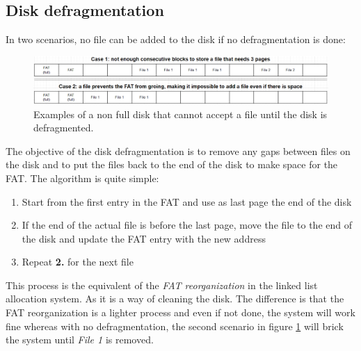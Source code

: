\documentclass[10pt,a4paper]{ULBreport}
\begin{document}
\subsection{Disk defragmentation}
In two scenarios, no file can be added to the disk if no defragmentation is done:
\begin{figure}[H]
    \centering
    \includegraphics[width=1\textwidth]{Reason_for_fragmentation_CA.png}
    \caption{Examples of a non full disk that cannot accept a file until the disk is defragmented. }
    \label{fig:defrag}
\end{figure}
The objective of the disk defragmentation is to remove any gaps between files on the disk and to put the files back to the end of the disk to make space for the FAT. The algorithm is quite simple:
\begin{enumerate}
    \item Start from the first entry in the FAT and use as last page the end of the disk
    \item If the end of the actual file is before the last page, move the file to the end of the disk and update the FAT entry with the new address
    \item Repeat \textbf{2.} for the next file
\end{enumerate}
This process is the equivalent of the \textit{FAT reorganization} in the linked list allocation system. As it is a way of cleaning the disk. The difference is that the FAT reorganization is a lighter process and even if not done, the system will work fine whereas with no defragmentation, the second scenario in figure \ref{fig:defrag} will brick the system until \textit{File 1} is removed. \\
\end{document}
